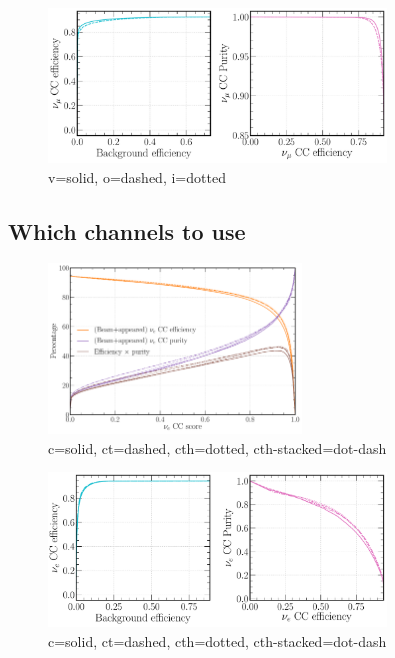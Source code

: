 \begin{figure} %
    \includegraphics[width=0.8\textwidth]{diagrams/7-cvn/chipsnet/repr_numu_comp_curves.pdf}
    \caption[repr numu comp curves short]
    {v=solid, o=dashed, i=dotted}
    \label{fig:repr_numu_comp_curves}
\end{figure}

\subsection{Which channels to use} %
\label{sec:cvn_baseline_channel} %

\begin{figure} %
    \includegraphics[width=0.6\textwidth]{diagrams/7-cvn/chipsnet/channel_nuel_eff_curves.pdf}
    \caption[channel nuel eff curves short]
    {c=solid, ct=dashed, cth=dotted, cth-stacked=dot-dash}
    \label{fig:channel_nuel_eff_curves}
\end{figure}

\begin{figure} %
    \includegraphics[width=0.8\textwidth]{diagrams/7-cvn/chipsnet/channel_nuel_comp_curves.pdf}
    \caption[channel nuel comp curves short]
    {c=solid, ct=dashed, cth=dotted, cth-stacked=dot-dash}
    \label{fig:channel_nuel_comp_curves}
\end{figure}

